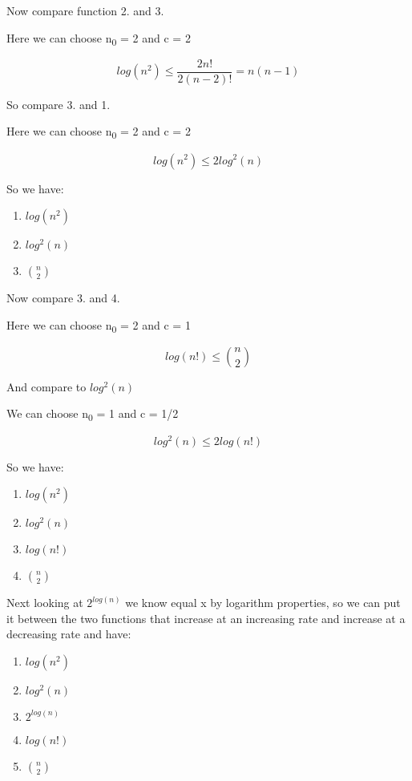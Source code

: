 \documentclass[]{article}
\providecommand{\tightlist}{%
  \setlength{\itemsep}{0pt}\setlength{\parskip}{0pt}}
\begin{document}
Now compare function 2. and 3.

Here we can choose n\textsubscript{0} = 2 and c = 2

\[log(n^2) \leq \frac{2n!}{2(n-2)!} = n(n-1)\]

So compare 3. and 1.

Here we can choose n\textsubscript{0} = 2 and c = 2

\[log(n^2) \leq 2log^2(n)\]

So we have:

\begin{enumerate}
\def\labelenumi{\arabic{enumi}.}
\tightlist
\item
  \(log(n^2)\)
\item
  \(log^2(n)\)
\item
  \(n \choose 2\)
\end{enumerate}

Now compare 3. and 4.

Here we can choose n\textsubscript{0} = 2 and c = 1

\[log(n!) \leq \binom{n}{2}\]

And compare to \(log^2(n)\)

We can choose n\textsubscript{0} = 1 and c = 1/2

\[log^2(n) \leq 2log(n!)\]

So we have:

\begin{enumerate}
\def\labelenumi{\arabic{enumi}.}
\tightlist
\item
  \(log(n^2)\)
\item
  \(log^2(n)\)
\item
  \(log(n!)\)
\item
  \(n \choose 2\)
\end{enumerate}

Next looking at \(2^{log(n)}\) we know equal x by logarithm properties,
so we can put it between the two functions that increase at an
increasing rate and increase at a decreasing rate and have:

\begin{enumerate}
\def\labelenumi{\arabic{enumi}.}
\tightlist
\item
  \(log(n^2)\)
\item
  \(log^2(n)\)
\item
  \(2^{log(n)}\)
\item
  \(log(n!)\)
\item
  \(n \choose 2\)
\end{enumerate}
\end{document}
